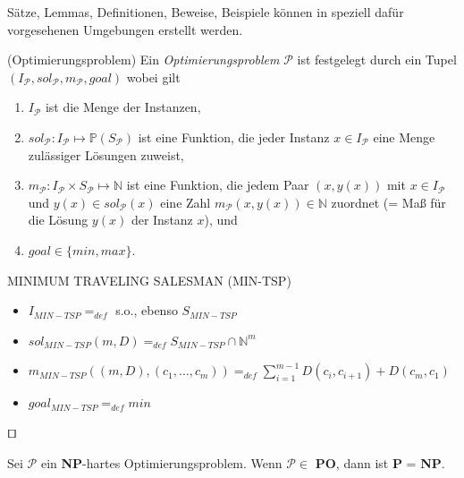 Sätze, Lemmas, Definitionen, Beweise, Beispiele können in speziell dafür vorgesehenen Umgebungen erstellt werden.

\begin{definition}(Optimierungsproblem)
	Ein \emph{Optimierungsproblem} $\mathcal{P}$ ist festgelegt durch ein Tupel
	$(I_\mathcal{P}, sol_\mathcal{P}, m_\mathcal{P}, goal)$ wobei gilt

	\begin{enumerate}
		\item $I_\mathcal{P}$ ist die Menge der Instanzen,
		\item $sol_\mathcal{P} : I_\mathcal{P} \longmapsto \mathbb{P}(S_\mathcal{P})$ ist eine Funktion, die jeder Instanz $x \in I_\mathcal{P}$ eine Menge zulässiger Lösungen zuweist,
		\item $m_\mathcal{P} : I_\mathcal{P} \times S_\mathcal{P} \longmapsto \mathbb{N}$ ist eine Funktion, die jedem Paar $(x,y(x))$ mit $x \in I_\mathcal{P}$ und $y(x) \in sol_\mathcal{P}(x)$ eine 	Zahl $m_\mathcal{P}(x,y(x)) \in \mathbb{N}$ zuordnet (= Maß für die Lösung $y(x)$ der Instanz $x$), und
		\item $goal \in \{min,max\}$.
	\end{enumerate}
\end{definition}

\begin{example} 
	MINIMUM TRAVELING SALESMAN (MIN-TSP)
	\begin{itemize}
		\item $I_{MIN-TSP} =_{def}$ s.o., ebenso $S_{MIN-TSP}$
		\item $sol_{MIN-TSP}(m,D) =_{def} S_{MIN-TSP} \cap \mathbb{N}^m$ 
		\item $m_{MIN-TSP}((m,D),(c_1, \ldots , c_m)) =_{def} \sum_{i=1}^{m-1} D(c_i, c_{i+1}) + D(c_m,c_1)$ 
		\item $goal_{MIN-TSP} =_{def} min$
	\end{itemize}
	\begin{flushright}
	$\qed$
	\end{flushright}
\end{example}

\begin{theorem} 
	Sei $\mathcal{P}$ ein \textbf{NP}-hartes Optimierungsproblem.
	Wenn $\mathcal{P} \in$ \textbf{PO}, dann ist \textbf{P} = \textbf{NP}.
\end{theorem}

